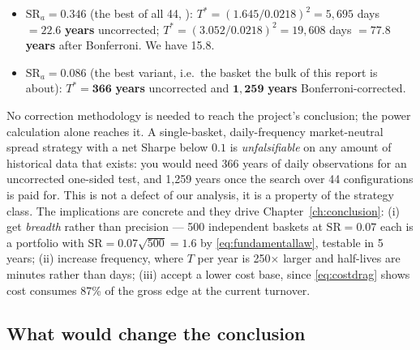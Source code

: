 \begin{itemize}
  \item $\mathrm{SR}_a=0.346$ (the best of all 44, ):
    $T^\ast=(1.645/0.0218)^2=5{,}695$ days $=\mathbf{22.6}$ \textbf{years} uncorrected;
    $T^\ast=(3.052/0.0218)^2=19{,}608$ days $=\mathbf{77.8}$ \textbf{years} after
    Bonferroni. We have 15.8.
  \item $\mathrm{SR}_a=0.086$ (the best  variant, i.e.\ the basket the bulk of
    this report is about): $T^\ast=\mathbf{366}$ \textbf{years} uncorrected and
    $\mathbf{1{,}259}$ \textbf{years} Bonferroni-corrected.
\end{itemize}

\begin{remark}
No correction methodology is needed to reach the project's conclusion; the power
calculation alone reaches it. A single-basket, daily-frequency market-neutral spread
strategy with a net Sharpe below $0.1$ is \emph{unfalsifiable} on any amount of historical
data that exists: you would need 366 years of daily observations for an uncorrected
one-sided test, and 1{,}259 years once the search over 44 configurations is paid for.
This is not a
defect of our analysis, it is a property of the strategy class. The implications are
concrete and they drive Chapter~\ref{ch:conclusion}: (i) get \emph{breadth} rather than
precision --- 500 independent baskets at $\mathrm{SR}=0.07$ each is a portfolio with
$\mathrm{SR}=0.07\sqrt{500}=1.6$ by \eqref{eq:fundamentallaw}, testable in 5 years;
(ii) increase frequency, where $T$ per year is 250$\times$ larger and half-lives are
minutes rather than days; (iii) accept a lower cost base, since
\eqref{eq:costdrag} shows cost consumes 87\% of the gross edge at the current turnover.
\end{remark}

\subsection{What would change the conclusion}
\label{sec:mt:whatwould}

